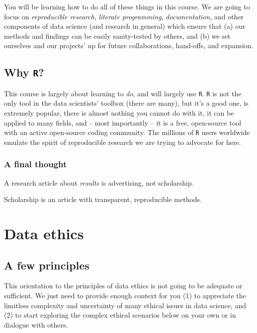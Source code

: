 \documentclass[]{book}
\begin{document}
You will be learning how to do all of these things in this course. We are going to focus on \emph{reproducible research}, \emph{literate programming}, \emph{documentation}, and other components of data science (and research in general) which ensure that (a) our methods and findings can be easily sanity-tested by others, and (b) we set ourselves and our projects' up for future collaborations, hand-offs, and expansion.

\hypertarget{why-r}{%
\section*{\texorpdfstring{Why \texttt{R}?}{Why R?}}\label{why-r}}

This course is largely about learning to \emph{do}, and will largely use \texttt{R}. \texttt{R} is not the only tool in the data scientists' toolbox (there are many), but it's a good one, is extremely popular, there is almost nothing you cannot do with it, it can be applied to many fields, and -- most importantly -- it is a free, open-source tool with an active open-source coding community. The millions of \texttt{R} users worldwide emulate the spirit of reproducible research we are trying to advocate for here.

\hypertarget{a-final-thought}{%
\subsection*{A final thought}\label{a-final-thought}}

A research article about \emph{results} is advertising, not scholarship.

Scholarship is an article with transparent, reproducible methods.

\hypertarget{data-ethics}{%
\chapter{Data ethics}\label{data-ethics}}

\hypertarget{a-few-principles}{%
\section*{A few principles}\label{a-few-principles}}

This orientation to the principles of data ethics is not going to be adequate or sufficient. We just need to provide enough context for you (1) to appreciate the limitless complexity and uncertainty of many ethical issues in data science, and (2) to start exploring the complex ethical scenarios below on your own or in dialogue with others.
\end{document}
